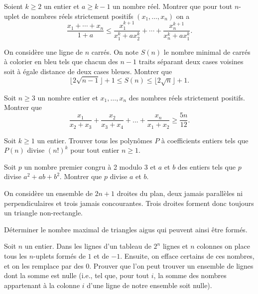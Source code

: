 \begin{exo}{}Soient $k \geq 2$ un entier et $a \geq k-1$ un nombre réel. Montrer que pour tout $n$-uplet de nombres réels strictement positifs $(x_{1}, \ldots, x_{n})$ on a
$$ \frac{x_{1}+ \cdots +x_{n}}{1+a} \leq  \frac{x_{1}^{k+1}}{x_{1}^{k}+a x_{2}^{k}}+ \cdots+ \frac{x_{n}^{k+1}}{x_{n}^{k}+a x_{1}^{k}}.$$
\end{exo}

\begin{exo}{}On considère une ligne de $n$ carrés. On note $S(n)$ le nombre minimal de carrés à colorier en bleu
tels que chacun des $n-1$ traits séparant deux cases voisines soit à égale distance de deux cases
bleues. Montrer que
$$ \lfloor 2 \sqrt {n-1} \rfloor+1 \leq S(n) \leq  \lfloor 2 \sqrt {n} \rfloor +1.$$
\end{exo}


\begin{exo}{{}
}Soit $n \geq 3$ un nombre entier et $x_{1}, \ldots, x_{n}$ des nombres réels strictement positifs. Montrer que \[\frac{x_1}{x_2+x_3}+\frac{x_2}{x_3+x_4}+...+\frac{x_n}{x_1+x_2}\geq \frac{5n}{12}.\]
\end{exo}

\begin{exo}{}Soit $k \geq 1$ un entier. Trouver tous les polynômes $P$ à coefficients entiers tels que $P(n)$ divise $(n!)^{k}$ pour tout entier $n \geq 1$.
\end{exo}

\begin{exo}{}
 Soit $p$ un nombre premier congru à 2 modulo 3 et $a$ et $b$ des entiers tels que $p$ divise $a^2 + ab + b^2$. Montrer que $p$ divise $a$ et $b$.\end{exo}

\begin{exo}{}
On consid\`ere un ensemble de $2n+1$ droites du plan, deux jamais parall\`eles ni perpendiculaires et trois jamais concourantes. Trois droites forment donc toujours un  triangle non-rectangle.

D\'eterminer le nombre maximal de triangles aigus qui peuvent ainsi \^etre form\'es.
\end{exo}

\begin{exo}{}
Soit $n$ un entier. Dans les lignes d'un tableau de $2^n$ lignes et $n$ colonnes on place tous les $n$-uplets form\'es de $1$ et de $-1$. Ensuite, on efface certains de ces nombres, et on les remplace par des $0$. Prouver que l'on peut trouver un ensemble de lignes dont la somme est nulle (i.e., tel que, pour tout $i$, la somme des nombres appartenant \`a la colonne $i$ d'une ligne de notre ensemble soit nulle).
\end{exo}



